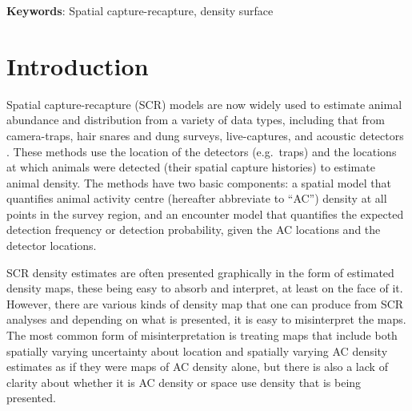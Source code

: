 \documentclass[10pt,a4paper]{article}
\begin{document}
\textbf{Keywords}: Spatial capture-recapture, density surface

\section{Introduction}

Spatial capture-recapture (SCR) models \citep*{Efford:04,Borchers+Efford:08, Royle+Young:08} are now widely used to estimate animal abundance and distribution from a variety of data types, including that from camera-traps, hair snares and dung surveys, live-captures, and acoustic detectors%
. These methods use the location of the detectors (e.g.\ traps) and the locations at which animals were detected (their spatial capture histories) to estimate animal density. The methods have two basic components: a spatial model that quantifies animal activity centre (hereafter abbreviate to ``AC'') density at all points in the survey region, and an encounter model that quantifies the expected detection frequency or detection probability, given the AC locations and the detector locations. 

SCR density estimates are often presented graphically in the form of estimated density maps, these being easy to absorb and interpret, at least on the face of it.  However, there are various kinds of density map that one can produce from SCR analyses and depending on what is presented, it is easy to misinterpret the maps. The most common form of misinterpretation is treating maps that include both spatially varying uncertainty about location and spatially varying AC density estimates as if they were maps of AC density alone, but there is also a lack of clarity about whether it is AC density or space use density that is being presented.

\end{document}
